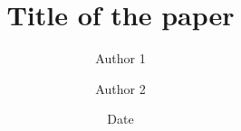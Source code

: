 \documentclass[twoside,article]{article}
\title{Title of the paper}
\author{Author 1 \and Author 2}
\date{Date}
\begin{document}
\maketitle{}

\cite{notsoshort}



\end{document}
